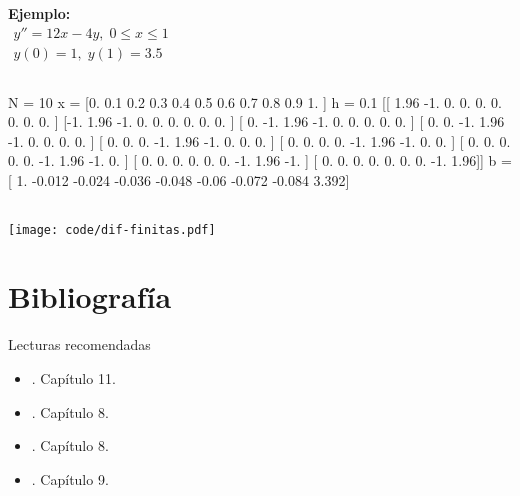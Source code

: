 \documentclass[9pt, aspectratio=169]{beamer}
\begin{document}
\begin{frame}
\begin{columns}[t]
\textbf{Ejemplo:}
\[ \begin{split} y'' = 12 x - 4 y, \; 0 \leq x \leq 1 \\ y(0) = 1,\; y(1) = 3.5 \end{split} \]

\end{columns}
\end{frame}

\begin{frame}[fragile]
    \begin{columns}

\begin{shell}
N = 10
x =  [0.  0.1 0.2 0.3 0.4 0.5 0.6 0.7 0.8 0.9 1. ] h =  0.1
[[ 1.96 -1.    0.    0.    0.    0.    0.    0.    0.  ]
 [-1.    1.96 -1.    0.    0.    0.    0.    0.    0.  ]
 [ 0.   -1.    1.96 -1.    0.    0.    0.    0.    0.  ]
 [ 0.    0.   -1.    1.96 -1.    0.    0.    0.    0.  ]
 [ 0.    0.    0.   -1.    1.96 -1.    0.    0.    0.  ]
 [ 0.    0.    0.    0.   -1.    1.96 -1.    0.    0.  ]
 [ 0.    0.    0.    0.    0.   -1.    1.96 -1.    0.  ]
 [ 0.    0.    0.    0.    0.    0.   -1.    1.96 -1.  ]
 [ 0.    0.    0.    0.    0.    0.    0.   -1.    1.96]]
b =  [ 1.    -0.012 -0.024 -0.036 -0.048 -0.06  -0.072 -0.084  3.392]
\end{shell}
\end{columns}
\end{frame}

\begin{frame}
\begin{center}
    \texttt{[image: code/dif-finitas.pdf]}
\end{center}
\end{frame}

\section*{Bibliografía}
\begin{frame}[allowframebreaks]{Lecturas recomendadas}
\begin{itemize}
    \item {}. Capítulo 11.
    \item {}. Capítulo 8.
    \item {}. Capítulo 8.
    \item {}. Capítulo 9.
\end{itemize}
\end{frame}
\end{document}
